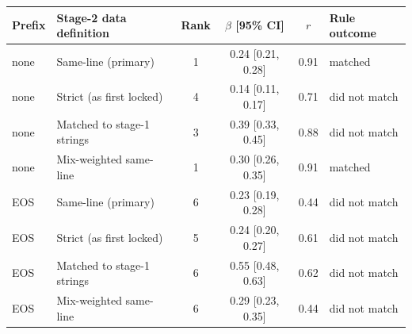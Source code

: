 \begin{tabular}{llcccl}
\toprule
Prefix & Stage-2 data definition & Rank & $\beta$ [95\% CI] & $r$ & Rule outcome \\
\midrule
none & Same-line (primary) & 1 & 0.24 [0.21, 0.28] & 0.91 & matched \\
none & Strict (as first locked) & 4 & 0.14 [0.11, 0.17] & 0.71 & did not match \\
none & Matched to stage-1 strings & 3 & 0.39 [0.33, 0.45] & 0.88 & did not match \\
none & Mix-weighted same-line & 1 & 0.30 [0.26, 0.35] & 0.91 & matched \\
EOS & Same-line (primary) & 6 & 0.23 [0.19, 0.28] & 0.44 & did not match \\
EOS & Strict (as first locked) & 5 & 0.24 [0.20, 0.27] & 0.61 & did not match \\
EOS & Matched to stage-1 strings & 6 & 0.55 [0.48, 0.63] & 0.62 & did not match \\
EOS & Mix-weighted same-line & 6 & 0.29 [0.23, 0.35] & 0.44 & did not match \\
\bottomrule
\end{tabular}
